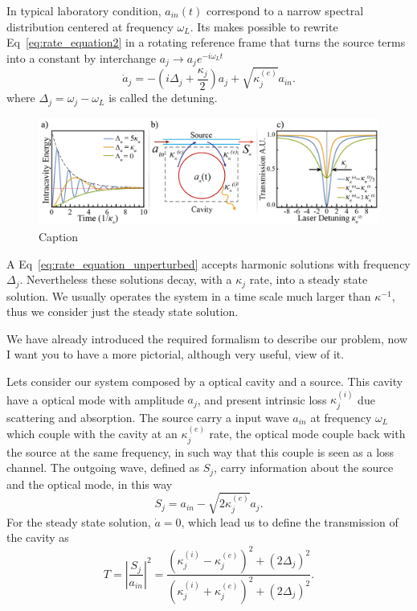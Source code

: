 In typical laboratory condition, $a_{in}(t)$ correspond to a narrow spectral distribution centered at frequency $\omega_L$. Its makes possible to rewrite Eq~\ref{eq:rate_equation2} in a rotating reference frame that turns the source terms into a constant by interchange $a_j \rightarrow a_je^{-i\omega_Lt}$
\begin{equation}
    \dot{a}_j = -\left(i\Delta_j +\frac{\kappa_j}{2}\right)a_j +\sqrt{\kappa^{(e)}_j}a_{in}.
    \label{eq:rate_equation_unperturbed}
\end{equation}
where $\Delta_j = \omega_j - \omega_L$ is called the detuning.
\begin{figure}[t!]
    \centering
    \includegraphics[width = 16cm]{Dissertation_rate_equation.jpg}
    \caption{Caption}
    \label{fig:rate_equations_single_mode}
\end{figure}
A Eq~\ref{eq:rate_equation_unperturbed} accepts harmonic solutions with frequency $\Delta_j$. Nevertheless these solutions decay, with a  $\kappa_j$ rate, into a steady state solution. We usually operates the system in a time scale much larger than $\kappa^{-1}$, thus we consider just the steady state solution. 

We have already introduced the required formalism to describe our problem, now I want you to have a more pictorial, although very useful, view of it. 

Lets consider our system composed by a optical cavity and a source. This cavity have a optical mode with amplitude $a_j$, and present intrinsic loss $\kappa_j^{(i)}$ due scattering and absorption. The source carry a input wave $a_{in}$ at frequency $\omega_L$ which couple with the cavity at an $\kappa_j^{(e)}$ rate, the optical mode couple back with the source at the same frequency, in such way that this couple is seen as a loss channel. The outgoing wave, defined as $S_j$, carry information about the source and the optical mode, in this way
\begin{equation}
    S_j = a_{in} - \sqrt{2 \kappa_j^{(e)}}a_j.
\end{equation}
For the steady state solution, $\dot{a} = 0$, which lead us to define the transmission of the cavity as
\begin{equation}
    T = \left|\frac{S_j}{a_{in}}\right|^2 = \frac{\left(\kappa_j^{(i)} -\kappa_j^{(e)}\right)^2 + (2\Delta_j)^2}{\left(\kappa_j^{(i)} +\kappa_j^{(e)}\right)^2 + (2\Delta_j)^2}.
    \label{eq:single_mode_transmission}
\end{equation}

